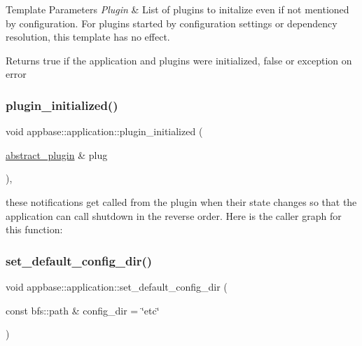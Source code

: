 \begin{DoxyTemplParams}{Template Parameters}
{\em Plugin} & List of plugins to initalize even if not mentioned by configuration. For plugins started by configuration settings or dependency resolution, this template has no effect. \\
\hline
\end{DoxyTemplParams}
\begin{DoxyReturn}{Returns}
true if the application and plugins were initialized, false or exception on error 
\end{DoxyReturn}
\mbox{\label{classappbase_1_1application_a110137cd2c59d1d998750eeb28443b5d}} 
\subsubsection{\texorpdfstring{plugin\+\_\+initialized()}{plugin\_initialized()}}
{\footnotesize\ttfamily void appbase\+::application\+::plugin\+\_\+initialized (\begin{DoxyParamCaption}\item[{\mbox{\hyperlink{classappbase_1_1abstract__plugin}{abstract\+\_\+plugin}} \&}]{plug }\end{DoxyParamCaption})\hspace{0.3cm}{\ttfamily [inline]}, {\ttfamily [protected]}}

these notifications get called from the plugin when their state changes so that the application can call shutdown in the reverse order. Here is the caller graph for this function\+:
\mbox{\label{classappbase_1_1application_a49901c76b365337c933e6485649a50b6}} 
\subsubsection{\texorpdfstring{set\+\_\+default\+\_\+config\+\_\+dir()}{set\_default\_config\_dir()}}
{\footnotesize\ttfamily void appbase\+::application\+::set\+\_\+default\+\_\+config\+\_\+dir (\begin{DoxyParamCaption}\item[{const bfs\+::path \&}]{config\+\_\+dir = {\ttfamily \char`\"{}etc\char`\"{}} }\end{DoxyParamCaption})}



